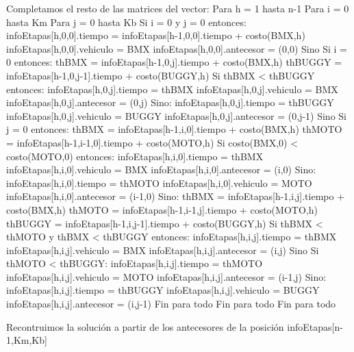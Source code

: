 \begin{codesnippet}
Completamos el resto de las matrices del vector:
Para h = 1 hasta n-1
	Para i = 0 hasta Km
    	Para j = 0 hasta Kb
        	Si i = 0 y j = 0 entonces:
            	infoEtapas[h,0,0].tiempo = infoEtapas[h-1,0,0].tiempo + costo(BMX,h)
                    infoEtapas[h,0,0].vehiculo = BMX
                    infoEtapas[h,0,0].antecesor = (0,0)
                Sino Si i = 0 entonces:
            	thBMX = infoEtapas[h-1,0,j].tiempo + costo(BMX,h)
                    thBUGGY = infoEtapas[h-1,0,j-1].tiempo + costo(BUGGY,h)
                    Si  thBMX < thBUGGY  entonces:
                	infoEtapas[h,0,j].tiempo = thBMX
    	            infoEtapas[h,0,j].vehiculo = BMX
                        infoEtapas[h,0,j].antecesor = (0,j)
                    Sino:
                	infoEtapas[h,0,j].tiempo = thBUGGY
    	            infoEtapas[h,0,j].vehiculo = BUGGY
                        infoEtapas[h,0,j].antecesor = (0,j-1)
                Sino Si j = 0 entonces:
                    thBMX = infoEtapas[h-1,i,0].tiempo + costo(BMX,h)
                    thMOTO = infoEtapas[h-1,i-1,0].tiempo + costo(MOTO,h)
             	Si costo(BMX,0) < costo(MOTO,0) entonces:
                	infoEtapas[h,i,0].tiempo = thBMX
    	            infoEtapas[h,i,0].vehiculo = BMX
                        infoEtapas[h,i,0].antecesor = (i,0)
    	        Sino:
                	infoEtapas[h,i,0].tiempo = thMOTO
    	            infoEtapas[h,i,0].vehiculo = MOTO
                        infoEtapas[h,i,0].antecesor = (i-1,0)
                Sino:
                    thBMX = infoEtapas[h-1,i,j].tiempo + costo(BMX,h)
                    thMOTO = infoEtapas[h-1,i-1,j].tiempo + costo(MOTO,h)
                    thBUGGY = infoEtapas[h-1,i,j-1].tiempo + costo(BUGGY,h)
            	Si thBMX < thMOTO y thBMX < thBUGGY  entonces:
                	infoEtapas[h,i,j].tiempo = thBMX
    	            infoEtapas[h,i,j].vehiculo = BMX
                        infoEtapas[h,i,j].antecesor = (i,j)
    	       Sino Si thMOTO < thBUGGY:
                	infoEtapas[h,i,j].tiempo = thMOTO
                        infoEtapas[h,i,j].vehiculo = MOTO
                        infoEtapas[h,i,j].antecesor = (i-1,j)
                  Sino:
                        infoEtapas[h,i,j].tiempo = thBUGGY
                        infoEtapas[h,i,j].vehiculo = BUGGY
                        infoEtapas[h,i,j].antecesor = (i,j-1)
           Fin para todo
      Fin para todo
 Fin para todo

Recontruimos la solución a partir de los antecesores
    de la posición infoEtapas[n-1,Km,Kb]

\end{codesnippet}

